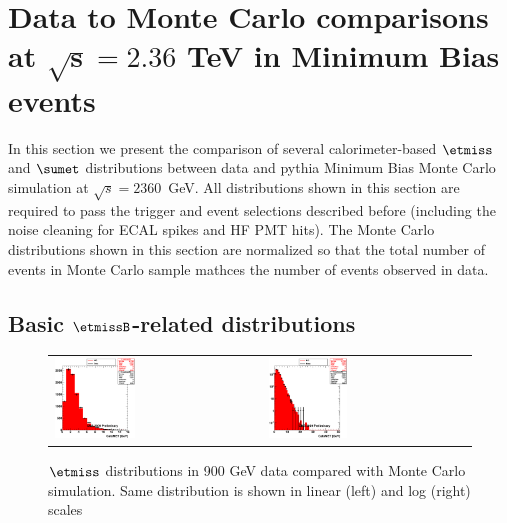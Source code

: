 \section[Data to Monte Carlo comparisons at $\sqrt{s}=2.36$ TeV in
  Minimum Bias events]{Data to Monte Carlo comparisons at $\boldsymbol{\sqrt{s}=2.36}$ TeV in
  Minimum Bias events}
\label{sc:DataVsMCMB2360}

In this section we present the comparison of several calorimeter-based $\etmiss$ and $\sumet$
distributions between data and {\sc pythia} Minimum Bias Monte Carlo simulation at $\sqrt{s}=2360$~GeV. 
All distributions shown in this section are required to pass the trigger and event selections
described before (including the noise cleaning for ECAL spikes and HF PMT hits). 
The Monte Carlo distributions shown in this section
are normalized so that the total number of events in Monte Carlo sample
mathces the number of events observed in data.

\subsection[Basic $\etmiss$-related distributions]{Basic $\etmissB$-related distributions}
\begin{figure}[h!]
 \centering
 \begin{tabular}{ll}
  \includegraphics[width=0.40\textwidth]{plots_DataVsMC_MB_2360GeV/h_calometPt_lin.eps} &
  \includegraphics[width=0.40\textwidth]{plots_DataVsMC_MB_2360GeV/h_calometPt.eps} \\
 \end{tabular}
 \caption{$\etmiss$ distributions in 900 GeV data compared
   with Monte Carlo simulation. Same distribution is shown in linear (left) and log (right) scales
   \label{fig:DataVsMC_MB_2360_1}}
\end{figure}

